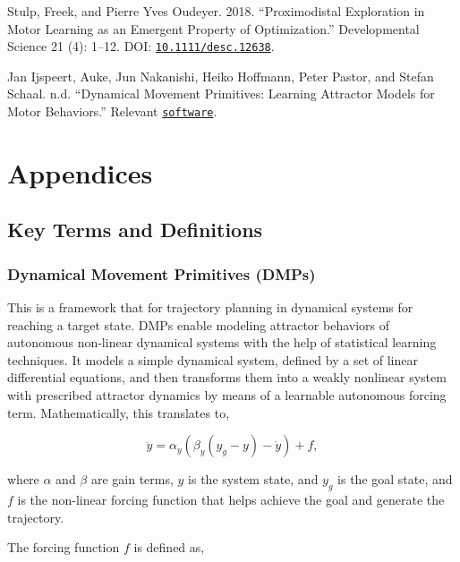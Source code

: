 \documentclass[10pt]{article}
\begin{document}
\begin{thebibliography}{5}
 Stulp, Freek, and Pierre Yves Oudeyer. 2018. “Proximodistal Exploration in Motor Learning as an Emergent Property of Optimization.” Developmental Science 21 (4): 1–12. DOI: \href{https://doi.org/10.1111/desc.12638}{\texttt{10.1111/desc.12638}}.

Jan Ijspeert, Auke, Jun Nakanishi, Heiko Hoffmann, Peter Pastor, and Stefan Schaal. n.d. “Dynamical Movement Primitives: Learning Attractor Models for Motor Behaviors.” Relevant  \href{http://www-clmc.usc.edu/Resources/Software}{\texttt{software}}.
\end{thebibliography}

\pagebreak

\appendix
\section*{Appendices}
\renewcommand{\thesubsection}{\Alph{subsection}}
\subsection{Key Terms and Definitions}\label{subsec:appendix_terms_def}

\subsubsection{Dynamical Movement Primitives (DMPs)}
This is a framework that for trajectory planning in dynamical systems for reaching a target state. DMPs enable modeling attractor behaviors of autonomous non-linear dynamical systems with the help of statistical learning techniques. It models a simple dynamical system, defined by a set of linear differential equations, and then transforms them into a weakly nonlinear system with prescribed attractor dynamics by means of a learnable autonomous forcing term. Mathematically, this translates to,

\begin{equation}
    \ddot{y} = \alpha_y(\beta_y(y_g-y) - \dot{y}) + f,
\end{equation}

where $\alpha$ and $\beta$ are gain terms, $y$ is the system state, and $y_g$ is the goal state, and $f$ is the non-linear forcing function that helps achieve the goal and generate the trajectory.

The forcing function $f$ is defined as,
\end{document}

